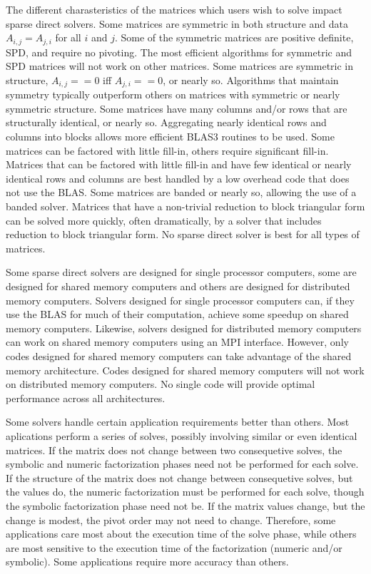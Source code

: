 \documentclass[acmtocl]{acmtrans2m}
\begin{document}
The different charasteristics of the matrices which users wish to
solve impact sparse direct solvers.  Some matrices are symmetric in both
structure and data $A_{i,j} = A_{j,i}$ for all $i$ and $j$.  Some of
the symmetric matrices are positive definite, SPD, and require no
pivoting.  The most efficient algorithms for symmetric and SPD
matrices will not work on other matrices.  Some matrices are symmetric in
structure, $A_{i,j} == 0$ iff $A_{j,i} == 0$, or nearly so.
Algorithms that maintain symmetry typically outperform others on
matrices with symmetric or nearly symmetric structure.  Some matrices have many
columns and/or rows that are structurally identical, or nearly so.
Aggregating nearly identical rows and columns into blocks allows more
efficient BLAS3 routines to be used.  Some matrices can be factored with little
fill-in, others require significant fill-in.  Matrices that can be
factored with little fill-in and have few identical or nearly identical
rows and columns are best handled by a low overhead code that does not
use the BLAS.  Some matrices are banded or nearly so, allowing the use
of a banded solver.  Matrices that have a non-trivial reduction to
block triangular form can be solved more quickly, often dramatically,
by a solver that includes reduction to block triangular form.  No sparse direct solver is best for all types of matrices.  

Some sparse direct solvers are designed for single processor
computers, some are designed for shared memory computers and others
are designed for distributed memory computers.  Solvers designed for
single processor computers can, if they use the BLAS for much of their
computation, achieve some speedup on shared memory computers.
Likewise, solvers designed for distributed memory computers can work
on shared memory computers using an MPI interface.  However, only
codes designed for shared memory computers can take advantage of the
shared memory architecture.  Codes designed for shared memory
computers will not work on distributed memory computers.  No single
code will provide optimal performance across all architectures.

Some solvers handle certain application requirements better than
others.  Most aplications perform a series of solves, possibly
involving similar or even identical matrices.  If the matrix does not
change between two consequetive solves, the symbolic and numeric
factorization phases need not be performed for each solve.  If the
structure of the matrix does not change between consequetive solves,
but the values do, the numeric factorization must be performed for
each solve, though the symbolic factorization phase need not be.  If
the matrix values change, but the change is modest, the pivot order
may not need to change.  Therefore, some applications care most about
the execution time of the solve phase, while others are most sensitive
to the execution time of the factorization (numeric and/or symbolic).
Some applications require more accuracy than others.
\end{document}
